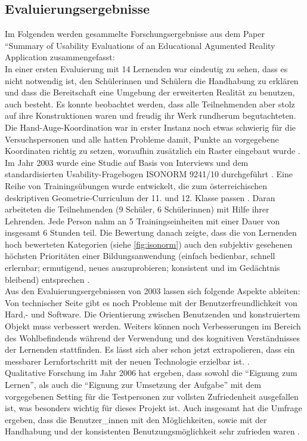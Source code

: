 \documentclass[deutsch]{llncs}
\begin{document}
\subsection{Evaluierungsergebnisse}
Im Folgenden werden gesammelte Forschungsergebnisse aus dem Paper ``Summary of Usability Evaluations of an Educational Agumented Reality Application zusammengefasst: \\
In einer ersten Evaluierung mit 14 Lernenden war eindeutig zu sehen, dass es nicht notwendig ist, den Schülerinnen und Schülern die Handhabung zu erklären und dass die Bereitschaft eine Umgebung der erweiterten Realität zu benutzen, auch besteht. Es konnte beobachtet werden, dass alle Teilnehmenden aber stolz auf ihre Konstruktionen waren und freudig ihr Werk rundherum begutachteten. Die Hand-Auge-Koordination war in erster Instanz noch etwas schwierig für die Versuchspersonen und alle hatten Probleme damit, Punkte an vorgegebene Koordinaten richtig zu setzen, woraufhin zusätzlich ein Raster eingebaut wurde \cite{Kaufmann:2002:MGE:1242073.1242086}.
Im Jahr 2003 wurde eine Studie auf Basis von Interviews und dem standardisierten Usability-Fragebogen ISONORM 9241/10 durchgeführt \cite{Kaufmann_summaryof}. Eine Reihe von Trainingsübungen wurde entwickelt, die zum österreichischen deskriptiven Geometrie-Curriculum der 11. und 12. Klasse passen \cite{Kaufmann_summaryof}.  Daran arbeiteten die Teilnehmenden (9 Schüler, 6 Schülerinnen) mit Hilfe ihrer Lehrenden. Jede Person nahm an 5 Trainingseinheiten mit einer Dauer von insgesamt 6 Stunden teil. Die Bewertung danach zeigte, dass die von Lernenden hoch bewerteten Kategorien (siehe \autoref{fig:isonorm}) auch den subjektiv gesehenen höchsten Prioritäten einer Bildungsanwendung (einfach bedienbar, schnell erlernbar; ermutigend, neues auszuprobieren; konsistent und im Gedächtnis bleibend) entsprechen \cite{Kaufmann_summaryof}.\\
Aus den Evaluierungsergebnissen von 2003 lassen sich folgende Aspekte ableiten: \\
Von technischer Seite gibt es noch Probleme mit der Benutzerfreundlichkeit von Hard,- und Software. Die Orientierung zwischen Benutzenden und konstruiertem Objekt muss verbessert werden. Weiters können noch Verbesserungen im Bereich des Wohlbefindends während der Verwendung und des kognitiven Verständnisses der Lernenden stattfinden.  Es lässt sich aber schon jetzt extrapolieren, dass ein messbarer Lernfortschritt mit der neuen Technologie erzielbar ist. \cite{article}. \\
Qualitative Forschung im Jahr 2006 hat ergeben, dass sowohl die ``Eignung zum Lernen'', als auch die ``Eignung zur Umsetzung der Aufgabe'' mit dem vorgegebenen Setting für die Testpersonen zur vollsten Zufriedenheit ausgefallen ist, was besonders wichtig für dieses Projekt ist. Auch insgesamt hat die Umfrage ergeben, dass die Benutzer\_innen mit den Möglichkeiten, sowie mit der Handhabung und der konsistenten Benutzungsmöglichkeit sehr zufrieden waren \cite{1667626}. \\
\end{document}
